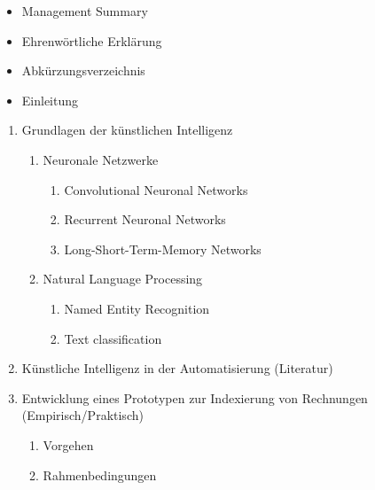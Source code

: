 \documentclass[12pt, twoside, table]{extarticle}
\begin{document}
{
    \renewcommand\labelitemi{--}
    \renewcommand{\labelenumi}{\arabic{enumi}}
    \renewcommand{\labelenumii}{\labelenumi.\arabic{enumii}}
    \renewcommand{\labelenumiii}{\labelenumii.\arabic{enumiii}}
    \begin{itemize}[topsep=0pt,itemsep=2pt,partopsep=4pt, parsep=4pt]
        \item Management Summary
        \item Ehrenwörtliche Erklärung
        \item Abkürzungsverzeichnis
        \item Einleitung
    \end{itemize}
    \begin{enumerate}[topsep=0pt,itemsep=2pt,partopsep=4pt, parsep=4pt]
        \item Grundlagen der künstlichen Intelligenz
        \begin{enumerate}[topsep=0pt,itemsep=2pt,partopsep=4pt, parsep=4pt]
            \item Neuronale Netzwerke
            \begin{enumerate}[topsep=0pt,itemsep=2pt,partopsep=4pt, parsep=4pt]
                \item Convolutional Neuronal Networks
                \item Recurrent Neuronal Networks
                \item Long-Short-Term-Memory Networks
            \end{enumerate}
            \item Natural Language Processing
            \begin{enumerate}[topsep=0pt,itemsep=2pt,partopsep=4pt, parsep=4pt]
                \item Named Entity Recognition
                \item Text classification
            \end{enumerate}
        \end{enumerate}
        \item Künstliche Intelligenz in der Automatisierung (Literatur)
        \item Entwicklung eines Prototypen zur Indexierung von Rechnungen (Empirisch/Praktisch)
        \begin{enumerate}[topsep=0pt,itemsep=2pt,partopsep=4pt, parsep=4pt]
            \item Vorgehen
            \item Rahmenbedingungen
            \begin{enumerate}[topsep=0pt,itemsep=2pt,partopsep=4pt, parsep=4pt]

\end{enumerate}
\end{enumerate}
\end{enumerate}}
\end{document}
